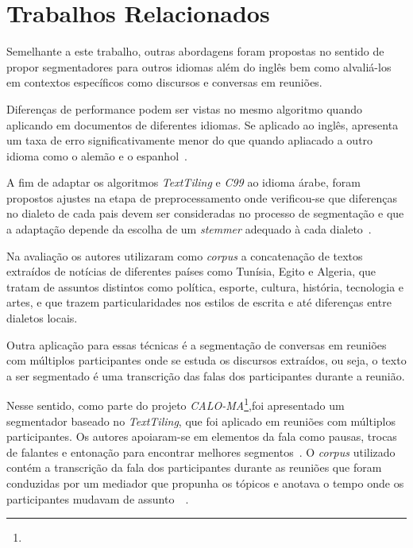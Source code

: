 \section{Trabalhos Relacionados}
	\label{sec:trabalhos}


Semelhante a este trabalho, outras abordagens foram propostas no sentido de propor segmentadores para outros idiomas além do inglês bem como alvaliá-los em contextos específicos como discursos e conversas em reuniões.

Diferenças de performance podem ser vistas no mesmo algoritmo quando aplicando em documentos de diferentes idiomas. Se aplicado ao inglês, apresenta um taxa de erro significativamente menor do que quando apliacado a outro idioma como o alemão e o espanhol~\cite{Kern2009}.


A fim de adaptar os algoritmos \textit{TextTiling} e \textit{C99} ao idioma árabe, foram propostos ajustes na etapa de preprocessamento onde verificou-se que diferenças no dialeto de cada pais devem ser consideradas no processo de segmentação e que a adaptação depende da escolha de um \textit{stemmer} adequado à cada dialeto~\cite{CHAIBI2014}.

Na avaliação os autores utilizaram como \textit{corpus} a concatenação de textos extraídos de notícias de diferentes países como Tunísia, Egito e Algeria, que tratam de assuntos distintos como política, esporte, cultura, história, tecnologia e artes, e que trazem particularidades nos estilos de escrita e até diferenças entre dialetos locais. 



Outra aplicação para essas técnicas é a segmentação de conversas em reuniões com múltiplos participantes onde se estuda os discursos extraídos, ou seja, o texto a ser segmentado é uma transcrição das falas dos participantes durante a reunião.


Nesse sentido, como parte do projeto \textit{CALO-MA}\footnote{\urlcaloproject},foi apresentado um segmentador baseado no  \textit{TextTiling}, que foi aplicado em reuniões com múltiplos participantes. Os autores apoiaram-se em elementos da fala como pausas, trocas de falantes e entonação para encontrar melhores segmentos~\cite{Galley2003}. O \textit{corpus} utilizado contém a transcrição da fala dos participantes durante as reuniões que foram conduzidas por um mediador que propunha os tópicos e anotava o tempo onde os participantes mudavam de assunto~\cite{Banerjee2006}~\cite{Tur2010}. 


